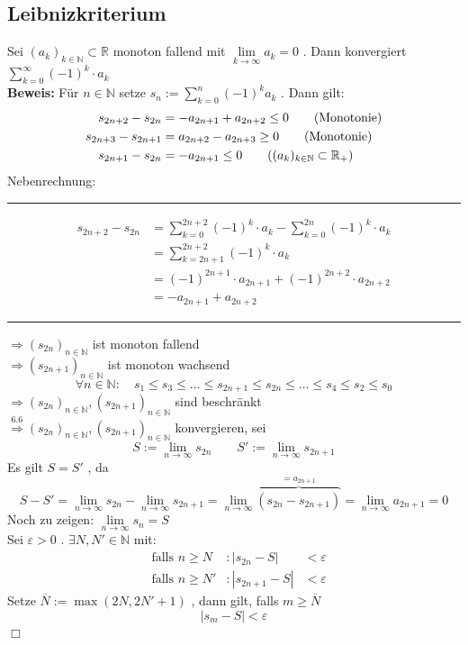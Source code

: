 \subsection{Leibnizkriterium} %
\label{sub:leibnizkriterium}
Sei $(a_k)_{k \in \mathds{N}} \subset \mathds{R}$ monoton fallend mit $\lim\limits_{k \to \infty} a_k =0$ . Dann konvergiert
$\sum\limits_{k=0}^{\infty} (-1)^k \cdot a_k$ \\
\textbf{Beweis:} 
Für $n \in \mathds{N}$ setze $s_n := \sum\limits_{k=0}^{n} (-1)^k a_k$ . Dann gilt:
\begin{align}
	s_{2n+2} - s_{2n} &= - a_{2n+1} + a_{2n+2} \leq 0 \tag{Monotonie} \\
	s_{2n+3} - s_{2n+1} &= a_{2n+2} - a_{2n+3} \geq 0 \tag{Monotonie} \\
	s_{2n+1} - s_{2n} &= - a_{2n+1} \leq 0 \tag{$(a_k)_{k \in \mathds{N}} \subset \mathds{R}_+$}
\end{align}
Nebenrechnung:   \hrule 
\begin{align*}
	s_{2n+2} - s_{2n} &= \sum\limits_{k=0}^{2n+2} (-1)^k \cdot a_k - \sum\limits_{k=0}^{2n} (-1)^k \cdot a_k \\
	&= \sum\limits_{k=2n+1}^{2n+2} (-1)^k \cdot a_k \\
	&= (-1)^{2n+1} \cdot a_{2n+1} + (-1)^{2n+2} \cdot a_{2n+2} \\
	&= - a_{2n+1} + a_{2n+2} 
\end{align*}
\hrule 
\vspace{\baselineskip} 
$\Rightarrow (s_{2n})_{n \in \mathds{N}}$ ist monoton fallend \\
$\Rightarrow (s_{2n+1})_{n \in \mathds{N}}$ ist monoton wachsend 
\[
	\forall n \in \mathds{N} : \quad s_1 \leq s_3 \leq \ldots \leq s_{2n+1} \leq s_{2n} \leq \ldots \leq s_4 \leq s_2 \leq s_0
\]
$\Rightarrow (s_{2n})_{n \in \mathds{N}} , (s_{2n+1})_{n \in \mathds{N}}$ sind beschränkt \\
$\overset{6.6}{\Rightarrow} (s_{2n})_{n \in \mathds{N}} , (s_{2n+1})_{n \in \mathds{N}}$ konvergieren, sei
\[
	S:= \lim\limits_{n \to \infty} s_{2n} \qquad S':= \lim\limits_{n \to \infty} s_{2n+1}
\]
Es gilt $S=S'$ , da
\[
	S-S' = \lim\limits_{n \to \infty} s_{2n} - \lim\limits_{n \to \infty} s_{2n+1} = 
	\lim\limits_{n \to \infty} \overbrace{\left(s_{2n} - s_{2n+1}\right)}^{= a_{2n+1}} = \lim\limits_{n \to \infty} a_{2n+1} =0
\]
Noch zu zeigen: $\lim\limits_{n \to \infty} s_n = S$ 
\vspace{\baselineskip} \\
Sei $\varepsilon >0$ . $\exists N,N' \in \mathds{N}$ mit: 
\[
\begin{array}{llll}
	&\text{falls } n \geq N &: |s_{2n} -S | &< \varepsilon \\
	&\text{falls } n \geq N' &: |s_{2n+1} -S | &< \varepsilon
\end{array}
\]
Setze $ \overline{N} := \max (2N , 2N'+1)$ , dann gilt, falls $m \geq  \overline{N}$
\[
	|s_m -S|< \varepsilon
\]
\hfill $\Box$ 

